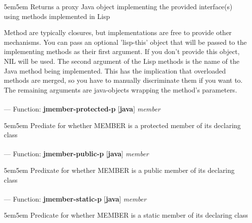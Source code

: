 \begin{adjustwidth}{5em}{5em}
Returns a proxy Java object implementing the provided interface(s) using methods implemented in Lisp

Method are typically closures, but implementations are free to provide other mechanisms. You can pass an optional 'lisp-this' object that will be passed to the implementing methods as their first argument. If you don't provide this object, NIL will be used. The second argument of the Lisp methods is the name of the Java method being implemented. This has the implication that overloaded methods are merged, so you have to manually discriminate them if you want to. The remaining arguments are java-objects wrapping the method's parameters.
\end{adjustwidth}

\paragraph{}
\label{JAVA:JMEMBER-PROTECTED-P}
--- Function: \textbf{jmember-protected-p} [\textbf{java}] \textit{member}

\begin{adjustwidth}{5em}{5em}
Prediate for whether MEMBER is a protected member of its declaring class
\end{adjustwidth}

\paragraph{}
\label{JAVA:JMEMBER-PUBLIC-P}
--- Function: \textbf{jmember-public-p} [\textbf{java}] \textit{member}

\begin{adjustwidth}{5em}{5em}
Predixate for whether MEMBER is a public member of its declaring class
\end{adjustwidth}

\paragraph{}
\label{JAVA:JMEMBER-STATIC-P}
--- Function: \textbf{jmember-static-p} [\textbf{java}] \textit{member}

\begin{adjustwidth}{5em}{5em}
Predicate for whether MEMBER is a static member of its declaring class
\end{adjustwidth}

